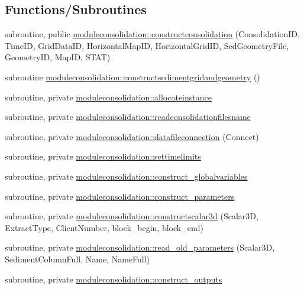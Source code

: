 \subsection*{Functions/\+Subroutines}
\begin{DoxyCompactItemize}
\item 
subroutine, public \mbox{\hyperlink{namespacemoduleconsolidation_aac026f0503f905b1fdf70f85f58f7b69}{moduleconsolidation\+::constructconsolidation}} (Consolidation\+ID, Time\+ID, Grid\+Data\+ID, Horizontal\+Map\+ID, Horizontal\+Grid\+ID, Sed\+Geometry\+File, Geometry\+ID, Map\+ID, S\+T\+AT)
\item 
subroutine \mbox{\hyperlink{namespacemoduleconsolidation_a7fa231a9af605419b5dbc619d4e2a60f}{moduleconsolidation\+::constructsedimentgridandgeometry}} ()
\item 
subroutine, private \mbox{\hyperlink{namespacemoduleconsolidation_ab891ed95a8328cd00b80d32b5bbc6bb6}{moduleconsolidation\+::allocateinstance}}
\item 
subroutine, private \mbox{\hyperlink{namespacemoduleconsolidation_adc874bdb2826879904126cec4cd75459}{moduleconsolidation\+::readconsolidationfilesname}}
\item 
subroutine, private \mbox{\hyperlink{namespacemoduleconsolidation_a59eaaf93a76021e109b8d97e2756ac51}{moduleconsolidation\+::datafileconnection}} (Connect)
\item 
subroutine, private \mbox{\hyperlink{namespacemoduleconsolidation_a8f78f5569405ac5d416a2919286511f3}{moduleconsolidation\+::settimelimits}}
\item 
subroutine, private \mbox{\hyperlink{namespacemoduleconsolidation_a4d351c8e79499df7d1edcdc11c64fd58}{moduleconsolidation\+::construct\+\_\+globalvariables}}
\item 
subroutine, private \mbox{\hyperlink{namespacemoduleconsolidation_a4699e64424e9e130e7f46758181721ec}{moduleconsolidation\+::construct\+\_\+parameters}}
\item 
subroutine, private \mbox{\hyperlink{namespacemoduleconsolidation_af867c8406bedea1eef3287708029fa21}{moduleconsolidation\+::constructscalar3d}} (Scalar3D, Extract\+Type, Client\+Number, block\+\_\+begin, block\+\_\+end)
\item 
subroutine, private \mbox{\hyperlink{namespacemoduleconsolidation_ad228e075c84afa273170a1c50c1a9f41}{moduleconsolidation\+::read\+\_\+old\+\_\+parameters}} (Scalar3D, Sediment\+Column\+Full, Name, Name\+Full)
\item 
subroutine, private \mbox{\hyperlink{namespacemoduleconsolidation_a1c6db66f62288736bfc6a93bb76fb12c}{moduleconsolidation\+::construct\+\_\+outputs}}

\end{DoxyCompactItemize}
